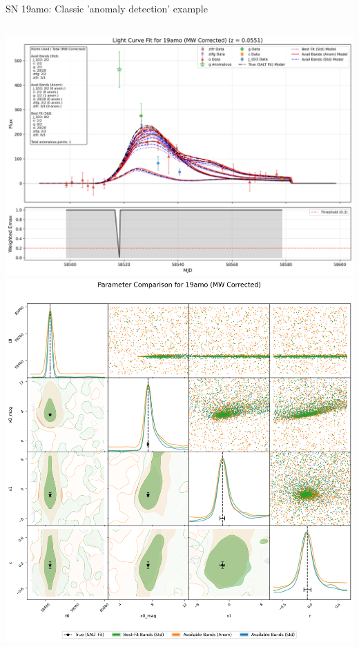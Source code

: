\documentclass[aspectratio=169]{beamer}
\begin{document}
\begin{frame}{SN 19amo: Classic 'anomaly detection' example}
  \begin{columns}
    \includegraphics[width=1\textwidth]{images/light_curve_comparison_19amo.png}
    \includegraphics[width=1\textwidth]{images/corner_comparison_19amo.png}
  \end{columns}
\end{frame}
\end{document}
